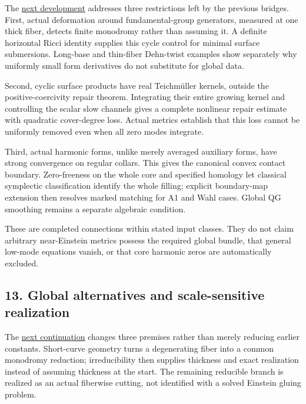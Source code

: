 \documentclass[
  10pt,
]{article}
\begin{document}
The \href{../continuation/20260924_global_data_realization.md}{next
development} addresses three restrictions left by the previous bridges.
First, actual deformation around fundamental-group generators, measured
at one thick fiber, detects finite monodromy rather than assuming it. A
definite horizontal Ricci identity supplies this cycle control for
minimal surface submersions. Long-base and thin-fiber Dehn-twist
examples show separately why uniformly small form derivatives do not
substitute for global data.

Second, cyclic surface products have real Teichmüller kernels, outside
the positive-coercivity repair theorem. Integrating their entire growing
kernel and controlling the scalar slow channels gives a complete
nonlinear repair estimate with quadratic cover-degree loss. Actual
metrics establish that this loss cannot be uniformly removed even when
all zero modes integrate.

Third, actual harmonic forms, unlike merely averaged auxiliary forms,
have strong convergence on regular collars. This gives the canonical
convex contact boundary. Zero-freeness on the whole core and specified
homology let classical symplectic classification identify the whole
filling; explicit boundary-map extension then resolves marked matching
for A1 and Wahl cases. Global QG smoothing remains a separate algebraic
condition.

These are completed connections within stated input classes. They do not
claim arbitrary near-Einstein metrics possess the required global
bundle, that general low-mode equations vanish, or that core harmonic
zeros are automatically excluded.

\hypertarget{global-alternatives-and-scale-sensitive-realization}{%
\subsection{13. Global alternatives and scale-sensitive
realization}\label{global-alternatives-and-scale-sensitive-realization}}

The \href{../continuation/20260924_global_structure_and_scales.md}{next
continuation} changes three premises rather than merely reducing earlier
constants. Short-curve geometry turns a degenerating fiber into a common
monodromy reduction; irreducibility then supplies thickness and exact
realization instead of assuming thickness at the start. The remaining
reducible branch is realized as an actual fiberwise cutting, not
identified with a solved Einstein gluing problem.
\end{document}
